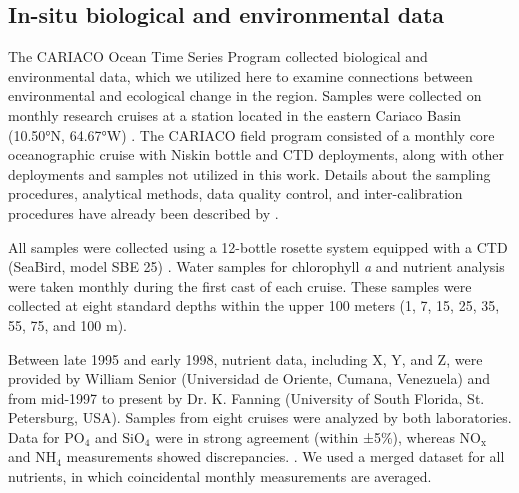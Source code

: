\documentclass[draft]{agujournal2019}
\begin{document}
\subsection{In-situ biological and environmental data}
    The CARIACO Ocean Time Series Program collected biological and environmental data, which we utilized here to examine connections between environmental and ecological change in the region. Samples were collected on monthly research cruises at a station located in the eastern Cariaco Basin (\ang{10.50}N, \ang{64.67}W) \cite{muller-karger_scientific_2019}.
    The CARIACO field program consisted of a monthly core oceanographic cruise with Niskin bottle and CTD deployments, along with other deployments and samples not utilized in this work. Details about the sampling procedures, analytical methods, data quality control, and inter-calibration procedures have already been described by . 
    
    All samples were collected using a 12-bottle rosette system equipped with a CTD (SeaBird, model SBE 25) \cite{astor_yrene_m_handbook_2013}. Water samples for chlorophyll \textit{a} and nutrient analysis were taken monthly during the first cast of each cruise. These samples were collected at eight standard depths within the upper 100 meters (1, 7, 15, 25, 35, 55, 75, and 100 m). 

    Between late 1995 and early 1998, nutrient data, including X, Y, and Z, were provided by William Senior (Universidad de Oriente, Cumana, Venezuela) and from mid-1997 to  present by Dr. K. Fanning (University of South Florida, St. Petersburg, USA). Samples from eight cruises were analyzed by both laboratories. Data for PO$_4$ and SiO$_4$ were in strong agreement (within ±5\%), whereas  NO$_\text{x}$ and NH$_4$ measurements showed discrepancies. \cite{taylor_ecosystem_2012}. We used a merged dataset for all nutrients, in which coincidental monthly measurements are averaged.
       
\end{document}
